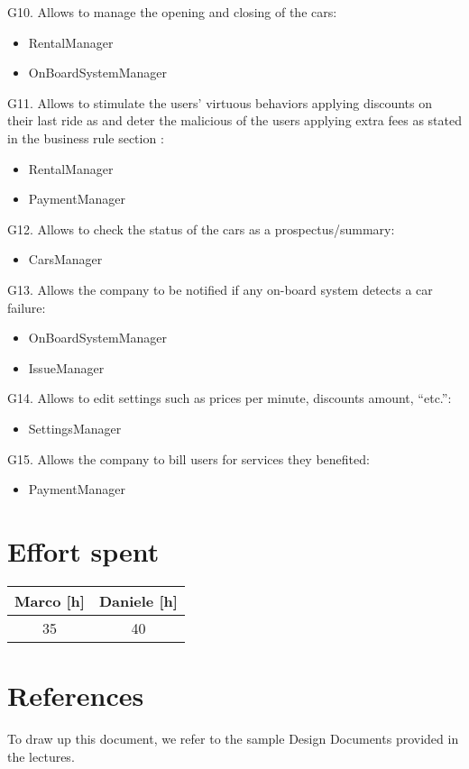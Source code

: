 \documentclass{scrreprt}
\begin{document}
G10. Allows to manage the opening and closing of the cars:
\begin{itemize}
\item RentalManager
\item OnBoardSystemManager
\end{itemize}
G11. Allows to stimulate the users’ virtuous behaviors applying discounts on their last ride as and deter the malicious of the users applying extra fees as stated in the business rule section :
\begin{itemize}
\item RentalManager
\item PaymentManager
\end{itemize}
G12. Allows to check the status of the cars as a prospectus/summary:
\begin{itemize}
\item CarsManager
\end{itemize}
G13. Allows the company to be notified if any on-board system detects a car failure:
\begin{itemize}
\item OnBoardSystemManager
\item IssueManager
\end{itemize}
G14. Allows to edit settings such as prices per minute, discounts amount, “etc.”:
\begin{itemize}
\item SettingsManager
\end{itemize}
G15. Allows the company to bill users for services they benefited:
\begin{itemize}
\item PaymentManager
\end{itemize}


\chapter{Effort spent}

\begin{center}
    \begin{tabular}{cc}
        \toprule
	   \textbf{ Marco [h]  }& \textbf{ Daniele [h] }\\
	   \midrule
        35&40\\
	\bottomrule
    \end{tabular}
\end{center}
\chapter{References}
To draw up this document, we refer to the sample Design Documents provided in the lectures.
\end{document}
